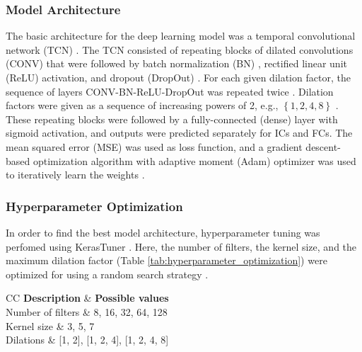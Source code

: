 \documentclass[sensors,article,submit,pdftex,moreauthors]{Definitions/mdpi}
\begin{document}
\subsubsection{Model Architecture}
The basic architecture for the deep learning model was a temporal convolutional network (TCN) \cite{Bai2018,Remy2020,Filtjens2020}. The TCN consisted of repeating blocks of dilated convolutions (CONV) \cite{YuKoltun2016,Bai2018} that were followed by batch normalization (BN) \cite{Ioffe2015}, rectified linear unit (ReLU) activation, and dropout (DropOut) \cite{Srivastava2014}. For each given dilation factor, the sequence of layers CONV-BN-ReLU-DropOut was repeated twice \cite{Remy2020}. Dilation factors were given as a sequence of increasing powers of 2, e.g., $\left\{1, 2, 4, 8\right\}$ \cite{VanDenOord2016,YuKoltun2016,Bai2018}. These repeating blocks were followed by a fully-connected (dense) layer with sigmoid activation, and outputs were predicted separately for ICs and FCs. The mean squared error (MSE) was used as loss function, and a gradient descent-based optimization algorithm with adaptive moment (Adam) optimizer was used to iteratively learn the weights \cite{Kingma2014,Schmidt2021}.

\subsubsection{Hyperparameter Optimization}
In order to find the best model architecture, hyperparameter tuning was perfomed using KerasTuner \cite{OMalley2019}. Here, the number of filters, the kernel size, and the maximum dilation factor (Table \ref{tab:hyperparameter_optimization}) were optimized for using a random search strategy \cite{Bergstra2012}.

\begin{table}[H] 
	\caption{Model hyperparameters that were optimized for, and the corresponding sets of possible values.\label{tab:hyperparameter_optimization}}
	\begin{tabularx}{\textwidth}{CC}
		\toprule
		\textbf{Description}	& \textbf{Possible values}\\
		\midrule
		Number of filters	& 8, 16, 32, 64, 128\\
		Kernel size			& 3, 5, 7\\
		Dilations 			& [1, 2], [1, 2, 4], [1, 2, 4, 8]\\
		\bottomrule
	\end{tabularx}
\end{table}
\end{document}
